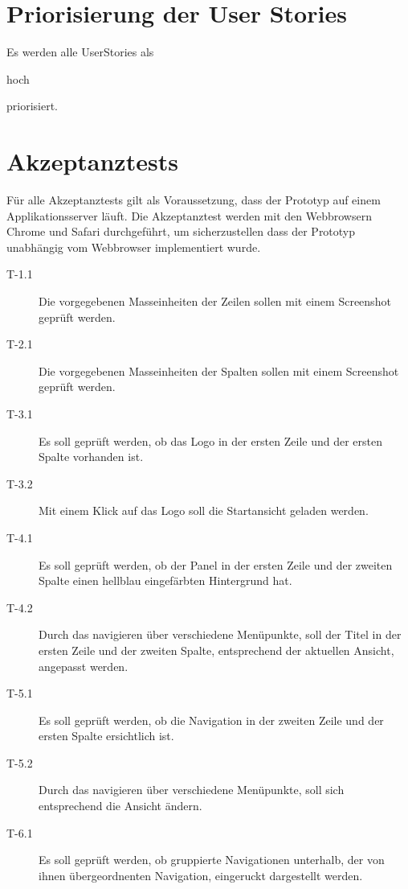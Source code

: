 \section{Priorisierung der User Stories}

Es werden alle UserStories als \begin{itshape}hoch\end{itshape} priorisiert.

\section{Akzeptanztests}

Für alle Akzeptanztests gilt als Voraussetzung, dass der Prototyp auf einem
Applikationsserver läuft. Die Akzeptanztest werden mit den Webbrowsern Chrome
und Safari durchgeführt, um sicherzustellen dass der Prototyp unabhängig vom
Webbrowser implementiert wurde.

\begin{description}
\item[T-1.1\label{itm:T-1.1}]
Die vorgegebenen Masseinheiten der Zeilen sollen mit einem Screenshot geprüft werden.

\item[T-2.1\label{itm:T-2.1}]
Die vorgegebenen Masseinheiten der Spalten sollen mit einem Screenshot geprüft werden.

\item[T-3.1\label{itm:T-3.1}]
Es soll geprüft werden, ob das Logo in der ersten Zeile und der ersten Spalte
vorhanden ist.

\item[T-3.2\label{itm:T-3.2}]
Mit einem Klick auf das Logo soll die Startansicht geladen werden.

\item[T-4.1\label{itm:T-4.1}]
Es soll geprüft werden, ob der Panel in der ersten Zeile und der zweiten Spalte
einen hellblau eingefärbten Hintergrund hat.

\item[T-4.2\label{itm:T-4.2}]
Durch das navigieren über verschiedene Menüpunkte, soll der Titel in der ersten
Zeile und der zweiten Spalte, entsprechend der aktuellen Ansicht, angepasst
werden.

\item[T-5.1\label{itm:T-5.1}]
Es soll geprüft werden, ob die Navigation in der zweiten Zeile und der
ersten Spalte ersichtlich ist.

\item[T-5.2\label{itm:T-5.2}]
Durch das navigieren über verschiedene Menüpunkte, soll sich entsprechend die
Ansicht ändern.

\item[T-6.1\label{itm:T-6.1}]
Es soll geprüft werden, ob gruppierte Navigationen unterhalb, der von ihnen
übergeordnenten Navigation, eingeruckt dargestellt werden.

\end{description}

